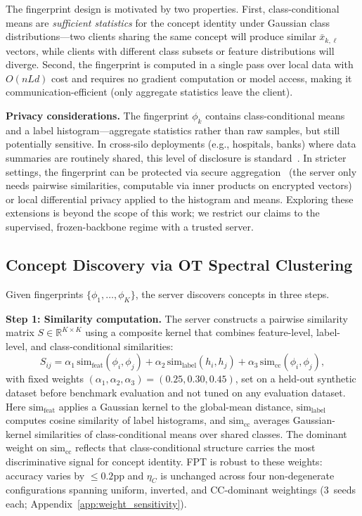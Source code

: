 \documentclass[11pt]{article}
\newcommand{\R}{\mathbb{R}}
\begin{document}
The fingerprint design is motivated by two properties.
First, class-conditional means are \emph{sufficient statistics} for the concept identity under Gaussian class distributions---two clients sharing the same concept will produce similar $\bar x_{k,\ell}$ vectors, while clients with different class subsets or feature distributions will diverge.
Second, the fingerprint is computed in a single pass over local data with $O(nLd)$ cost and requires no gradient computation or model access, making it communication-efficient (only aggregate statistics leave the client).

\textbf{Privacy considerations.}
The fingerprint $\phi_k$ contains class-conditional means and a label histogram---aggregate statistics rather than raw samples, but still potentially sensitive.
In cross-silo deployments (e.g., hospitals, banks) where data summaries are routinely shared, this level of disclosure is standard~\citep{kairouz2021advances}.
In stricter settings, the fingerprint can be protected via secure aggregation~\citep{bonawitz2017practical} (the server only needs pairwise similarities, computable via inner products on encrypted vectors) or local differential privacy applied to the histogram and means.
Exploring these extensions is beyond the scope of this work; we restrict our claims to the supervised, frozen-backbone regime with a trusted server.


\subsection{Concept Discovery via OT Spectral Clustering}
\label{sec:discovery}

Given fingerprints $\{\phi_1, \ldots, \phi_K\}$, the server discovers concepts in three steps.

\textbf{Step 1: Similarity computation.}
The server constructs a pairwise similarity matrix $S \in \R^{K \times K}$ using a composite kernel that combines feature-level, label-level, and class-conditional similarities:
\begin{equation}
S_{ij} = \alpha_1 \,\mathrm{sim}_{\mathrm{feat}}(\phi_i, \phi_j) + \alpha_2 \,\mathrm{sim}_{\mathrm{label}}(h_i, h_j) + \alpha_3 \,\mathrm{sim}_{\mathrm{cc}}(\phi_i, \phi_j),
\end{equation}
with fixed weights $(\alpha_1, \alpha_2, \alpha_3) = (0.25, 0.30, 0.45)$, set on a held-out synthetic dataset before benchmark evaluation and not tuned on any evaluation dataset.
Here $\mathrm{sim}_{\mathrm{feat}}$ applies a Gaussian kernel to the global-mean distance, $\mathrm{sim}_{\mathrm{label}}$ computes cosine similarity of label histograms, and $\mathrm{sim}_{\mathrm{cc}}$ averages Gaussian-kernel similarities of class-conditional means over shared classes.
The dominant weight on $\mathrm{sim}_{\mathrm{cc}}$ reflects that class-conditional structure carries the most discriminative signal for concept identity.
FPT is robust to these weights: accuracy varies by $\le 0.2$pp and $\eta_C$ is unchanged across four non-degenerate configurations spanning uniform, inverted, and CC-dominant weightings (3~seeds each; Appendix~\ref{app:weight_sensitivity}).
\end{document}
